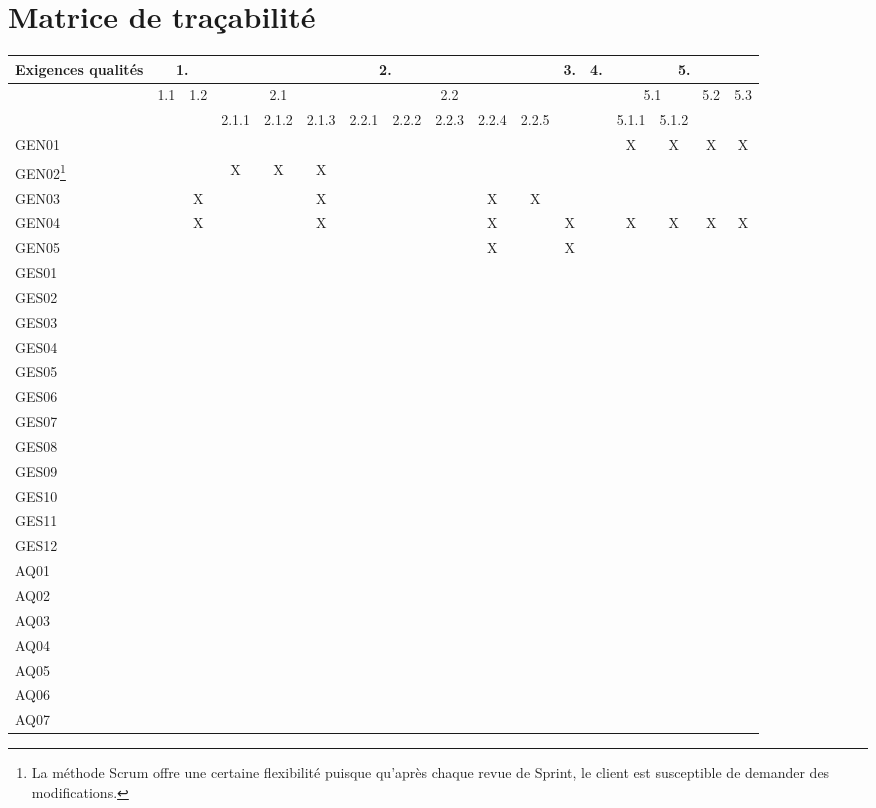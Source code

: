 \chapter{Matrice de traçabilité}
\begin{tabular}{|p{}|c|c|c|c|c|c|c|c|c|c|c|c|c|c|c|c|}
\hline
	Exigences qualités& \multicolumn{2}{c|}{1.} & \multicolumn{8}{c|}{2.} & 3. & 4. & \multicolumn{4}{c|}{5.} \\ 
\hline
	& 1.1 & 1.2 & \multicolumn{3}{c|}{2.1} & \multicolumn{5}{c|}{2.2} & & & \multicolumn{2}{c|}{5.1} & 5.2 & 5.3 \\
\hline
	& & & 2.1.1 & 2.1.2 & 2.1.3 & 2.2.1 & 2.2.2 & 2.2.3 & 2.2.4 & 2.2.5 & & & 5.1.1 & 5.1.2 & & \\
\hline  
	GEN01 & & & & & & & & & & & & & X & X & X & X \\
\hline  
	GEN02\footnote{La méthode Scrum offre une certaine flexibilité puisque qu’après chaque revue de Sprint, le client est susceptible de demander des modifications.} & & & X & X & X & & & & & & & & & & & \\
\hline  
	GEN03 & & X & & & X & & & & X & X & & & & & & \\
\hline  
	GEN04 & & X & & & X & & & & X & & X & & X & X & X & X \\
\hline  
	GEN05 & & & & & & & & & X & & X & & & & & \\
\hline  
	GES01 & & & & & & & & & & & & & & & & \\
\hline  
	GES02 & & & & & & & & & & & & & & & & \\
\hline  
	GES03 & & & & & & & & & & & & & & & & \\
\hline  
	GES04 & & & & & & & & & & & & & & & & \\
\hline  
	GES05 & & & & & & & & & & & & & & & & \\
\hline  
	GES06 & & & & & & & & & & & & & & & & \\
\hline  
	GES07 & & & & & & & & & & & & & & & & \\
\hline  
	GES08 & & & & & & & & & & & & & & & & \\
\hline  
	GES09 & & & & & & & & & & & & & & & & \\
\hline  
	GES10 & & & & & & & & & & & & & & & & \\
\hline  
	GES11 & & & & & & & & & & & & & & & & \\
\hline  
	GES12 & & & & & & & & & & & & & & & & \\
\hline  
	AQ01 & & & & & & & & & & & & & & & & \\
\hline  
	AQ02 & & & & & & & & & & & & & & & & \\
\hline  
	AQ03 & & & & & & & & & & & & & & & & \\	
\hline  
	AQ04 & & & & & & & & & & & & & & & & \\	
\hline  
	AQ05 & & & & & & & & & & & & & & & & \\	
\hline  
	AQ06 & & & & & & & & & & & & & & & & \\	
\hline  
	AQ07 & & & & & & & & & & & & & & & & \\	
							

 \hline
\end{tabular}